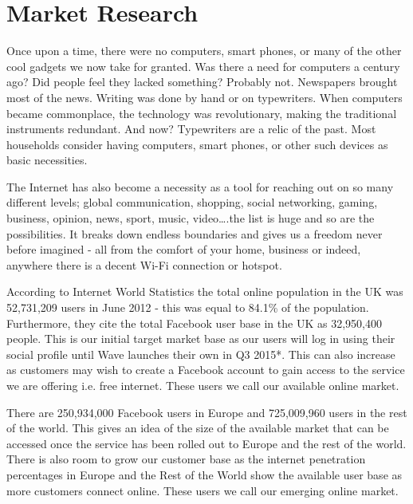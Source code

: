 \documentclass[letterpaper,10pt,openany,oneside,english]{sphinxmanual}
\begin{document}
\section{Market Research}
\label{\detokenize{market-analysis:market-research}}
Once upon a time, there were no computers, smart phones, or many of the other cool gadgets we now take for granted. Was there a need for computers a century ago? Did people feel they lacked something? Probably not. Newspapers brought most of the news. Writing was done by hand or on typewriters. When computers became commonplace, the technology was revolutionary, making the traditional instruments redundant. And now? Typewriters are a relic of the past. Most households consider having computers, smart phones, or other such devices as basic necessities.

The Internet has also become a necessity as a tool for reaching out on so many different levels; global communication, shopping, social networking, gaming, business, opinion, news, sport, music, video….the list is huge and so are the possibilities. It breaks down endless boundaries and gives us a freedom never before imagined - all from the comfort of your home, business or indeed, anywhere there is a decent Wi-Fi connection or hotspot.

According to Internet World Statistics the total online population in the UK was 52,731,209 users in June 2012 - this was equal to 84.1\% of the population. Furthermore, they cite the total Facebook user base in the UK as 32,950,400 people. This is our initial target market base as our users will log in using their social profile until Wave launches their own in Q3 2015*. This can also increase as customers may wish to create a Facebook account to gain access to the service we are offering i.e. free internet. These users we call our available online market.

There are 250,934,000 Facebook users in Europe and 725,009,960 users in the rest of the world. This gives an idea of the size of the available market that can be accessed once the service has been rolled out to Europe and the rest of the world. There is also room to grow our customer base as the internet penetration percentages in Europe and the Rest of the World show the available user base as more customers connect online. These users we call our emerging online market.

\end{document}
